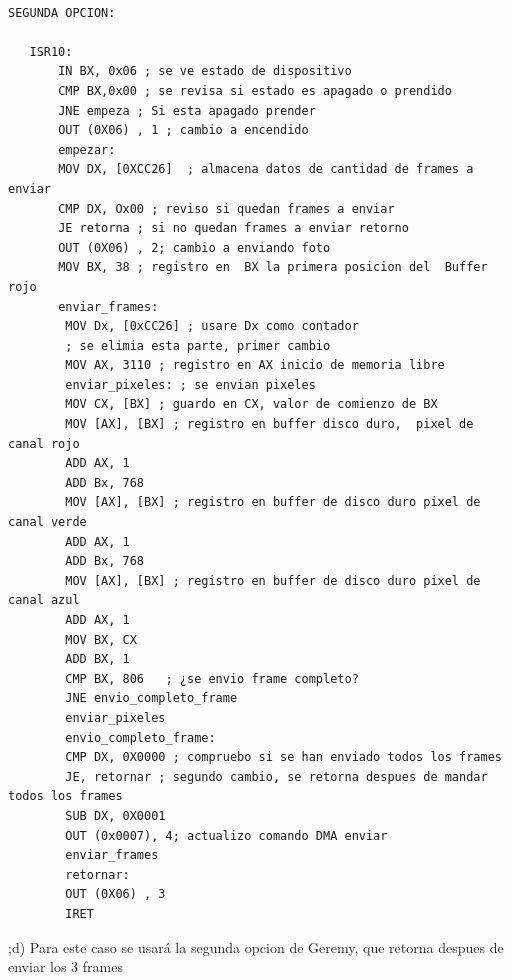 \documentclass{article}
\begin{document}
    \begin{lstlisting} 

SEGUNDA OPCION:

   ISR10:
       IN BX, 0x06 ; se ve estado de dispositivo
       CMP BX,0x00 ; se revisa si estado es apagado o prendido
       JNE empeza ; Si esta apagado prender
       OUT (0X06) , 1 ; cambio a encendido
       empezar:
       MOV DX, [0XCC26]  ; almacena datos de cantidad de frames a enviar
       CMP DX, Ox00 ; reviso si quedan frames a enviar
       JE retorna ; si no quedan frames a enviar retorno
       OUT (0X06) , 2; cambio a enviando foto
       MOV BX, 38 ; registro en  BX la primera posicion del  Buffer rojo
       enviar_frames:
        MOV Dx, [0xCC26] ; usare Dx como contador
        ; se elimia esta parte, primer cambio
        MOV AX, 3110 ; registro en AX inicio de memoria libre
        enviar_pixeles: ; se envian pixeles
        MOV CX, [BX] ; guardo en CX, valor de comienzo de BX
        MOV [AX], [BX] ; registro en buffer disco duro,  pixel de canal rojo
        ADD AX, 1
        ADD Bx, 768
        MOV [AX], [BX] ; registro en buffer de disco duro pixel de canal verde
        ADD AX, 1
        ADD Bx, 768
        MOV [AX], [BX] ; registro en buffer de disco duro pixel de canal azul
        ADD AX, 1
        MOV BX, CX
        ADD BX, 1
        CMP BX, 806   ; ¿se envio frame completo?
        JNE envio_completo_frame
        enviar_pixeles
        envio_completo_frame:
        CMP DX, 0X0000 ; compruebo si se han enviado todos los frames
        JE, retornar ; segundo cambio, se retorna despues de mandar todos los frames
        SUB DX, 0X0001
        OUT (0x0007), 4; actualizo comando DMA enviar 
        enviar_frames
        retornar:
        OUT (0X06) , 3
        IRET
    \end{lstlisting}
       
       
       
       
       
       
       
       
       

    
    
        ;d) Para este caso se usará la segunda opcion de Geremy, que retorna despues de enviar los 3 frames   
    
\end{document}
